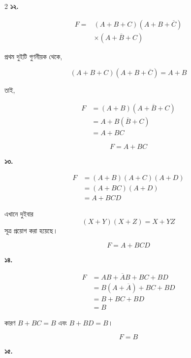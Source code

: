 \begin{multicols}{2}
\textbf{১২.}

\[
\begin{aligned}
F
={}&(A+B+C)(A+B+\overline C)\\
&\times(A+\overline B+C)
\end{aligned}
\]

প্রথম দুইটি গুণনীয়ক থেকে,

\[
(A+B+C)(A+B+\overline C)=A+B
\]

তাই,

\[
\begin{aligned}
F
&=(A+B)(A+\overline B+C)\\
&=A+B(\overline B+C)\\
&=A+BC
\end{aligned}
\]

\[
\boxed{F=A+BC}
\]

\medskip


\textbf{১৩.}

\[
\begin{aligned}
F
&=(A+B)(A+C)(A+D)\\
&=(A+BC)(A+D)\\
&=A+BCD
\end{aligned}
\]

{\footnotesize
এখানে দুইবার
\[
(X+Y)(X+Z)=X+YZ
\]
সূত্র প্রয়োগ করা হয়েছে।
}

\[
\boxed{F=A+BCD}
\]

\medskip


\textbf{১৪.}

\[
\begin{aligned}
F
&=AB+\overline AB+BC+BD\\
&=B(A+\overline A)+BC+BD\\
&=B+BC+BD\\
&=B
\end{aligned}
\]

{\footnotesize
কারণ \(B+BC=B\) এবং \(B+BD=B\)।
}

\[
\boxed{F=B}
\]

\medskip


\textbf{১৫.}


\end{multicols}
